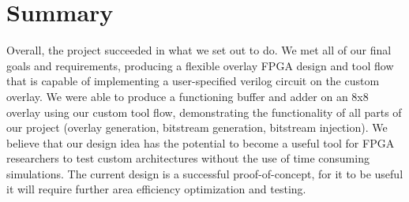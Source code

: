 \section{Summary} %

Overall, the project succeeded in what we set out to do.
We met all of our final goals and requirements, producing a flexible overlay FPGA design and tool flow that is capable of implementing a user-specified verilog circuit on the custom overlay.
We were able to produce a functioning buffer and adder on an 8x8 overlay using our custom tool flow, demonstrating the functionality of all parts of our project (overlay generation, bitstream generation, bitstream injection).
We believe that our design idea has the potential to become a useful tool for FPGA researchers to test custom architectures without the use of time consuming simulations.
The current design is a successful proof-of-concept, for it to be useful it will require further area efficiency optimization and testing.


